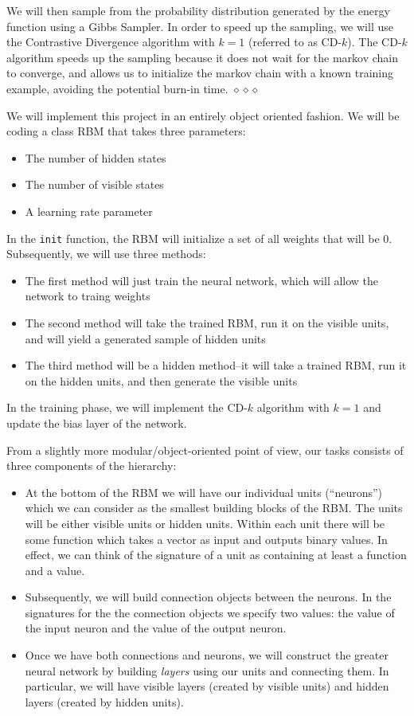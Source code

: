 \documentclass[12pt]{article}
\begin{document}
We will then sample from the probability distribution generated by the energy function using a Gibbs Sampler. In order to speed up the sampling, we will use the Contrastive Divergence algorithm with $k=1$ (referred to as CD-$k$). The CD-$k$ algorithm speeds up the sampling because it does not wait for the markov chain to converge, and allows us to initialize the markov chain with a known training example, avoiding the potential burn-in time. $\diamond \diamond \diamond$

We will implement this project in an entirely object oriented fashion. We will be coding a class RBM that takes three parameters:
\begin{itemize}
  \item The number of hidden states
  \item The number of visible states
  \item A learning rate parameter
\end{itemize}

In the \texttt{init} function, the RBM will initialize a set of all weights that will be 0. Subsequently, we will use three methods:
\begin{itemize}
  \item The first method will just train the neural network, which will allow the network to traing weights
  \item The second method will take the trained RBM, run it on the visible units, and will yield a generated sample of hidden units
  \item The third method will be a hidden method--it will take a trained RBM, run it on the hidden units, and then generate the visible units
\end{itemize}

In the training phase, we will implement the CD-$k$ algorithm with $k = 1$ and update the bias layer of the network. 

From a slightly more modular/object-oriented point of view, our tasks consists of three components of the hierarchy:
\begin{itemize}
  \item At the bottom of the RBM we will have our individual units (``neurons'') which we can consider as the smallest building blocks of the RBM. The units will be either visible units or hidden units. Within each unit there will be some function which takes a vector as input and outputs binary values. In effect, we can think of the signature of a unit as containing at least a function and a value.
  \item Subsequently, we will build connection objects between the neurons. In the signatures for the the connection objects we specify two values: the value of the input neuron and the value of the output neuron.
  \item Once we have both connections and neurons, we will construct the greater neural network by building \textit{layers} using our units and connecting them. In particular, we will have visible layers (created by visible units) and hidden layers (created by hidden units).
\end{itemize}
\end{document}
